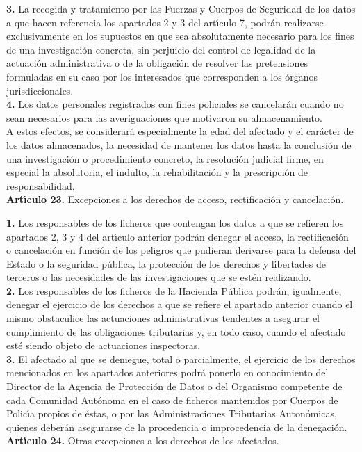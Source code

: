 {\bf 3.} La recogida y tratamiento por las Fuerzas y Cuerpos de Seguridad de 
los datos a que hacen referencia los apartados 2 y 3 del art\'{\i}culo 7, 
podr\'an realizarse exclusivamente en los supuestos en que sea absolutamente 
necesario para los fines de una investigaci\'on concreta, sin perjuicio del 
control de legalidad de la actuaci\'on administrativa o de la obligaci\'on de 
resolver las pretensiones formuladas en su caso por los interesados que 
corresponden a los \'organos jurisdiccionales.\\

{\bf 4.} Los datos personales registrados con fines policiales se cancelar\'an 
cuando no sean necesarios para las averiguaciones que motivaron su 
almacenamiento.\\
A estos efectos, se considerar\'a especialmente la edad del afectado y el 
car\'acter de los datos almacenados, la necesidad de mantener los datos hasta 
la conclusi\'on de una investigaci\'on o procedimiento concreto, la 
resoluci\'on judicial firme, en especial la absolutoria, el indulto, la 
rehabilitaci\'on y la prescripci\'on de responsabilidad.
\vspace{0.3cm}\\
{\large {\bf Art\'{\i}culo 23.} Excepciones a los derechos de acceso, 
rectificaci\'on y cancelaci\'on.}

{\bf 1.} Los responsables de los ficheros que contengan los datos a que se 
refieren los apartados 2, 3 y 4 del art\'{\i}culo anterior podr\'an denegar el 
acceso, la rectificaci\'on o cancelaci\'on en funci\'on de los peligros que 
pudieran derivarse para la defensa del Estado o la seguridad p\'ublica, la 
protecci\'on de los derechos y libertades de terceros o las necesidades de las 
investigaciones que se est\'en realizando.\\

{\bf 2.} Los responsables de los ficheros de la Hacienda P\'ublica podr\'an,
igualmente, denegar el ejercicio de los derechos a que se refiere el apartado 
anterior cuando el mismo obstaculice las actuaciones administrativas tendentes 
a asegurar el cumplimiento de las obligaciones tributarias y, en todo caso, 
cuando el afectado est\'e siendo objeto de actuaciones inspectoras.\\

{\bf 3.} El afectado al que se deniegue, total o parcialmente, el ejercicio de 
los derechos mencionados en los apartados anteriores podr\'a ponerlo en 
conocimiento del Director de la Agencia de Protecci\'on de Datos o del 
Organismo competente de cada Comunidad Aut\'onoma en el caso de ficheros 
mantenidos por Cuerpos de Polic\'{\i}a propios de \'estas, o por las 
Administraciones Tributarias Auton\'omicas, quienes deber\'an asegurarse de la 
procedencia o improcedencia de la denegaci\'on.
\vspace{0.3cm}\\
{\large {\bf Art\'{\i}culo 24.} Otras excepciones a los derechos de los 
afectados.}

